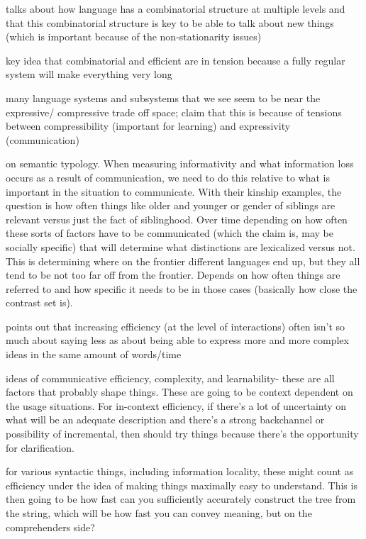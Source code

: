 \documentclass[]{article}
\begin{document}
\cite{kirby2015} talks about how language has a combinatorial structure at multiple levels and that this combinatorial structure is key to be able to talk about new things (which is important because of the non-stationarity issues) 

\cite{kirby2015} key idea that combinatorial and efficient are in tension because a fully regular system will make everything very long

\cite{kirby2015} many language systems and subsystems that we see seem to be near the expressive/ compressive trade off space; claim that this is because of tensions between compressibility (important for learning) and expressivity (communication) 

\cite{kemp2018} on semantic typology. When measuring informativity and what information loss occurs as a result of communication, we need to do this relative to what is important in the situation to communicate. With their kinship examples, the question is how often things like older and younger or gender of siblings are relevant versus just the fact of siblinghood. Over time depending on how often these sorts of factors have to be communicated (which the claim is, may be socially specific) that will determine what distinctions are lexicalized versus not. This is determining where on the frontier different languages end up, but they all tend to be not too far off from the frontier. Depends on how often things are referred to and how specific it needs to be in those cases (basically how close the contrast set is). 

\cite{hawkins2021} points out that increasing efficiency (at the level of interactions) often isn't so much about saying less as about being able to express more and more complex ideas in the same amount of words/time 
 
\cite{gibson2019} ideas of communicative efficiency, complexity, and learnability- these are all factors that probably shape things. These are going to be context dependent on the usage situations. For in-context efficiency, if there's a lot of uncertainty on what will be an adequate description and there's a strong backchannel or possibility of incremental, then should try things because there's the opportunity for clarification. 

\cite{gibson2019} for various syntactic things, including information locality, these might count as efficiency under the idea of making things maximally easy to understand. This is then going to be how fast can you sufficiently accurately construct the tree from the string, which will be how fast you can convey meaning, but on the comprehenders side? 
\end{document}
